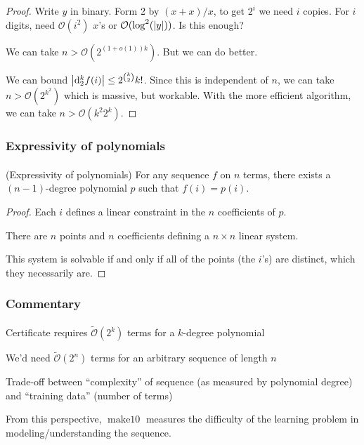 \documentclass{beamer}                             %
\newcommand*{\BigO}{\mathcal{O}}
\DeclareMathOperator{\maketen}{make10}
\newenvironment{wideitemize}
  {\itemize\setlength{\itemsep}{0.5cm}}
  {\enditemize}
\begin{document}
\begin{frame}
{\begin{proof}
{      Write \( y \) in binary. Form 2 by \( (x + x) / x \), to get \( 2^i
      \) we need \( i \) copies. For \( i \) digits, need \( \BigO(i^2)
      \) \( x \)'s or \( \BigO(\log^2(\abs{y})) \). Is this enough?

      We can take \( n > \BigO(2^{(1 + o(1)) k}) \). But we can do better.

      We can bound \( \abs{\dd_2^k f(i)} \leq 2^{\binom{k}{2}} k! \). Since
      this is independent of \( n \), we can take \( n > \BigO(2^{k^2}) \)
      which is massive, but workable. With the more efficient algorithm, we
      can take \( n > \BigO(k^2 2^k) \).
    }
  \end{proof}
}
\end{frame}

\begin{frame}
\frametitle{Expressivity of polynomials}
\framesubtitle{}

\begin{theorem}{(Expressivity of polynomials)}
  For any sequence \( f \) on \( n \) terms, there exists a \( (n
  - 1) \)-degree polynomial \( p \) such that \( f(i) = p(i) \).
\end{theorem}
\begin{proof}
  Each \( i \) defines a linear constraint
  in the \( n \) coefficients of \( p \).

  There are \( n \) points and \( n \) coefficients
  defining a \( n \times n \) linear system.

  This system is solvable if and only if all of the points
  (the \( i \)'s) are distinct, which they necessarily are.
\end{proof}
\end{frame}

\begin{frame}
\frametitle{Commentary}
\framesubtitle{}

\begin{wideitemize}
  \item Certificate requires \( \widetilde{\BigO}(2^k)
    \) terms for a \( k \)-degree polynomial
  \item We'd need \( \widetilde{\BigO}(2^n) \)
    terms for an arbitrary sequence of length \( n \)
  \item Trade-off between \enquote{complexity} of sequence (as measured
    by polynomial degree) and \enquote{training data} (number of terms)
  \item From this perspective, \( \maketen \) measures the difficulty
    of the learning problem in modeling/understanding the sequence.
\end{wideitemize}
\end{frame}
\end{document}

